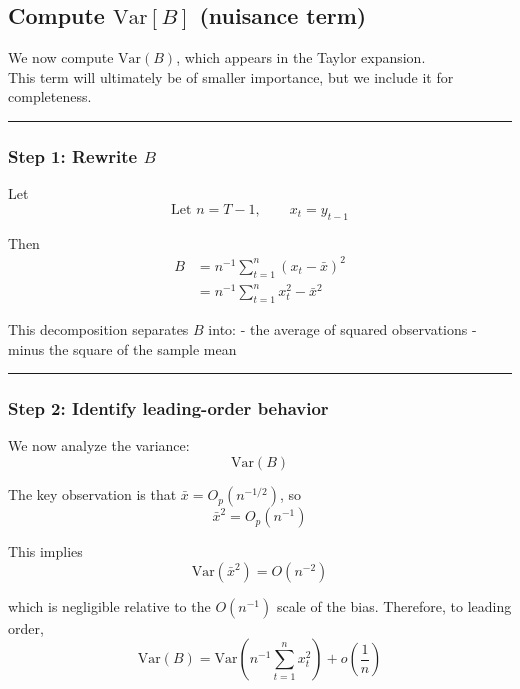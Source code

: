 \documentclass[11pt]{article}
\begin{document}
    \subsection{\texorpdfstring{Compute \(\text{Var}[B]\) (nuisance
term)}{Compute \textbackslash text\{Var\}{[}B{]} (nuisance term)}}\label{compute-textvarb-nuisance-term}

We now compute \(\text{Var}(B)\), which appears in the Taylor
expansion.\\
This term will ultimately be of smaller importance, but we include it
for completeness.

\begin{center}\rule{0.5\linewidth}{0.5pt}\end{center}

\subsubsection{\texorpdfstring{Step 1: Rewrite
\(B\)}{Step 1: Rewrite B}}\label{step-1-rewrite-b}

Let \[
\text{Let } n=T-1,\qquad x_t=y_{t-1}
\]

Then \[
\begin{aligned}
B
&= n^{-1}\sum_{t=1}^n (x_t-\bar x)^2\\
&= n^{-1}\sum_{t=1}^n x_t^2-\bar x^2
\end{aligned}
\]

This decomposition separates \(B\) into: - the average of squared
observations - minus the square of the sample mean

\begin{center}\rule{0.5\linewidth}{0.5pt}\end{center}

\subsubsection{Step 2: Identify leading-order
behavior}\label{step-2-identify-leading-order-behavior}

We now analyze the variance: \[
\text{Var}(B)
\]

The key observation is that \(\bar x = O_p(n^{-1/2})\), so \[
\bar x^2 = O_p(n^{-1})
\]

This implies \[
\text{Var}(\bar x^2) = O(n^{-2})
\]

which is negligible relative to the \(O(n^{-1})\) scale of the bias.
Therefore, to leading order, \[
\text{Var}(B)=\text{Var}\!\left(n^{-1}\sum_{t=1}^n x_t^2\right)+o\!\left(\frac{1}{n}\right)
\]
\end{document}
